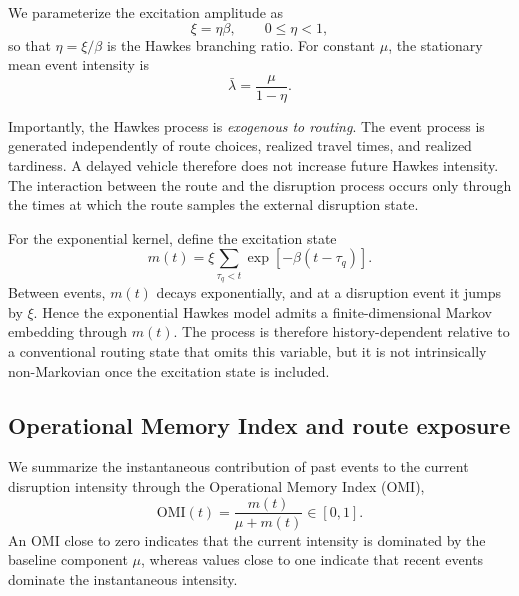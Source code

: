 \documentclass[preprint,12pt]{elsarticle}
\newcommand{\1}{\mathbf{1}}
\begin{document}
We parameterize the excitation amplitude as
\begin{equation}
	\xi=\eta\beta,
	\qquad 0\leq\eta<1,
	\label{eq:branching}
\end{equation}
so that $\eta=\xi/\beta$ is the Hawkes branching ratio.
For constant $\mu$, the stationary mean event intensity is
\begin{equation}
	\bar{\lambda}
	=
	\frac{\mu}{1-\eta}.
	\label{eq:hawkes_stationary_rate}
\end{equation}

Importantly, the Hawkes process is \emph{exogenous to routing}.
The event process is generated independently of route choices, realized
travel times, and realized tardiness. A delayed vehicle therefore does not
increase future Hawkes intensity. The interaction between the route and the
disruption process occurs only through the times at which the route samples
the external disruption state.

For the exponential kernel, define the excitation state
\begin{equation}
	m(t)
	=
	\xi
	\sum_{\tau_q<t}
	\exp\!\left[-\beta(t-\tau_q)\right].
	\label{eq:memory_state}
\end{equation}
Between events, $m(t)$ decays exponentially, and at a disruption event it jumps
by $\xi$. Hence the exponential Hawkes model admits a finite-dimensional Markov
embedding through $m(t)$. The process is therefore history-dependent relative
to a conventional routing state that omits this variable, but it is not
intrinsically non-Markovian once the excitation state is included.

\subsection{Operational Memory Index and route exposure}
\label{subsec:omi}

We summarize the instantaneous contribution of past events to the current
disruption intensity through the Operational Memory Index (OMI),
\begin{equation}
	\mathrm{OMI}(t)
	=
	\frac{m(t)}
	{\mu+m(t)}
	\in[0,1].
	\label{eq:omi}
\end{equation}
An OMI close to zero indicates that the current intensity is dominated by the
baseline component $\mu$, whereas values close to one indicate that recent
events dominate the instantaneous intensity.
\end{document}
